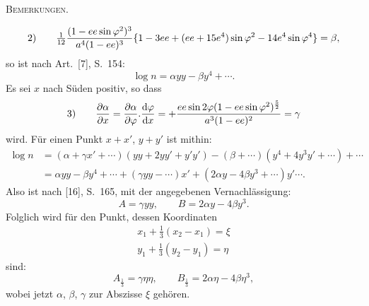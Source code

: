 \begingroup
\clearpage
{}\hfill\textsc{Bemerkungen.}\hfill\mbox{}\par\medskip
\begingroup\footnotesize
\[
\begin{array}{r@{\qquad}l}
2)&\displaystyle \tfrac1{12}\frac{(1-ee\sin\varphi^2)^3}{a^4(1-ee)^3}
\{1-3ee+(ee+15e^4)\sin\varphi^2-14e^4\sin\varphi^4\}=\beta,
\end{array}
\]
so ist nach Art.~[7], S.~154:
\[
\log n=\alpha yy-\beta y^4+\cdots.
\]
Es sei $x$ nach Süden positiv, so dass
\[
\begin{array}{r@{\qquad}l}
3)&\displaystyle\frac{\partial\alpha}{\partial x}
=\frac{\partial\alpha}{\partial\varphi}.\frac{\mathrm d\varphi}{\mathrm dx}
=+\frac{ee\sin2\varphi(1-ee\sin\varphi^2)^{\frac52}}{a^3(1-ee)^2}=\gamma
\end{array}
\]
wird. Für einen Punkt $x+x'$, $y+y'$ ist mithin:
\[
\begin{aligned}
\log n&=(\alpha+\gamma x'+\cdots)(yy+2yy'+y'y')-(\beta+\cdots)(y^4+4y^3y'+\cdots)+\cdots\\
&=\alpha yy-\beta y^4+\cdots+(\gamma yy-\cdots)x'+(2\alpha y-4\beta y^3+\cdots)y'\cdots.
\end{aligned}
\]
Also ist nach [16], S.~165, mit der angegebenen Vernachlässigung:
\[
A=\gamma yy,\qquad B=2\alpha y-4\beta y^3.
\]
Folglich wird für den Punkt, dessen Koordinaten
\[
\begin{gathered}
x_1+\tfrac13(x_2-x_1)=\xi\\
y_1+\tfrac13(y_2-y_1)=\eta
\end{gathered}
\]
sind:
\[
A_{\frac13}=\gamma\eta\eta,\qquad B_{\frac13}=2\alpha\eta-4\beta\eta^3,
\]
wobei jetzt $\alpha$, $\beta$, $\gamma$ zur Abszisse $\xi$ gehören.

